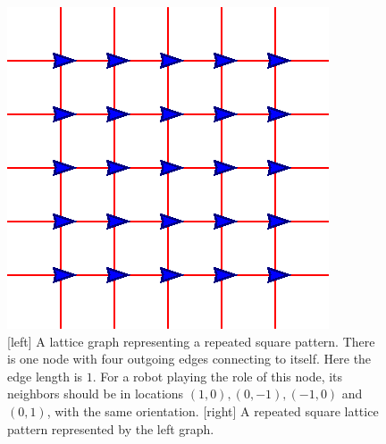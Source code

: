\begin{figure}
    \centering
    \begin{minipage}[b]{0.45\linewidth}
        \centering
        
    \end{minipage}
    \begin{minipage}[b]{0.45\linewidth}
        \centering
        \includegraphics[trim=0.5cm 0.5cm 0.5cm 0.5cm, clip=true]{figs/sq-lat}
    \end{minipage}
    \caption{[left] A lattice graph representing a repeated square
    pattern. There is one node with four outgoing edges connecting to
    itself. Here the edge length is $1$. For a robot playing the role
    of this node, its neighbors should be in locations $(1, 0), (0,
    -1), (-1, 0)$ and $(0, 1)$, with the same orientation. [right]
    A repeated square lattice pattern represented by the left
    graph.}
    \label{fig:sq}
\end{figure}
